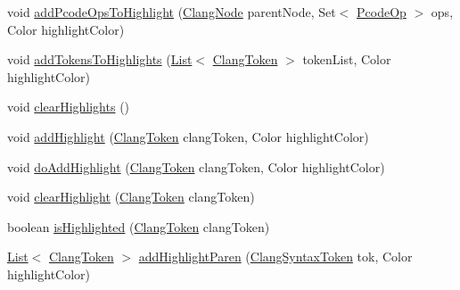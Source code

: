 \begin{DoxyCompactItemize}
\item 
void \mbox{\hyperlink{classghidra_1_1app_1_1decompiler_1_1component_1_1_clang_highlight_controller_a999122a27059713e3033e404e204e20f}{add\+Pcode\+Ops\+To\+Highlight}} (\mbox{\hyperlink{interfaceghidra_1_1app_1_1decompiler_1_1_clang_node}{Clang\+Node}} parent\+Node, Set$<$ \mbox{\hyperlink{class_pcode_op}{Pcode\+Op}} $>$ ops, Color highlight\+Color)
\item 
void \mbox{\hyperlink{classghidra_1_1app_1_1decompiler_1_1component_1_1_clang_highlight_controller_a918b0d193cddef3e884da17c1813bb46}{add\+Tokens\+To\+Highlights}} (\mbox{\hyperlink{xml_8hh_ab5ab62f46b3735557c125f91b40ac155}{List}}$<$ \mbox{\hyperlink{classghidra_1_1app_1_1decompiler_1_1_clang_token}{Clang\+Token}} $>$ token\+List, Color highlight\+Color)
\item 
void \mbox{\hyperlink{classghidra_1_1app_1_1decompiler_1_1component_1_1_clang_highlight_controller_a23d3b639418118f916813e02d99d8025}{clear\+Highlights}} ()
\item 
void \mbox{\hyperlink{classghidra_1_1app_1_1decompiler_1_1component_1_1_clang_highlight_controller_a8a3fd199e6bb9bf1533edbeedfadc614}{add\+Highlight}} (\mbox{\hyperlink{classghidra_1_1app_1_1decompiler_1_1_clang_token}{Clang\+Token}} clang\+Token, Color highlight\+Color)
\item 
void \mbox{\hyperlink{classghidra_1_1app_1_1decompiler_1_1component_1_1_clang_highlight_controller_adcaa163e6517db404fb5aee28b20b08d}{do\+Add\+Highlight}} (\mbox{\hyperlink{classghidra_1_1app_1_1decompiler_1_1_clang_token}{Clang\+Token}} clang\+Token, Color highlight\+Color)
\item 
void \mbox{\hyperlink{classghidra_1_1app_1_1decompiler_1_1component_1_1_clang_highlight_controller_a059003e77f6c6d6ecd7727c6840aefb8}{clear\+Highlight}} (\mbox{\hyperlink{classghidra_1_1app_1_1decompiler_1_1_clang_token}{Clang\+Token}} clang\+Token)
\item 
boolean \mbox{\hyperlink{classghidra_1_1app_1_1decompiler_1_1component_1_1_clang_highlight_controller_ae14a72d11ebc6ca440c68fe3ade4bb8d}{is\+Highlighted}} (\mbox{\hyperlink{classghidra_1_1app_1_1decompiler_1_1_clang_token}{Clang\+Token}} clang\+Token)
\item 
\mbox{\hyperlink{xml_8hh_ab5ab62f46b3735557c125f91b40ac155}{List}}$<$ \mbox{\hyperlink{classghidra_1_1app_1_1decompiler_1_1_clang_token}{Clang\+Token}} $>$ \mbox{\hyperlink{classghidra_1_1app_1_1decompiler_1_1component_1_1_clang_highlight_controller_a6a321654fc1984f10228d9fba4527da1}{add\+Highlight\+Paren}} (\mbox{\hyperlink{classghidra_1_1app_1_1decompiler_1_1_clang_syntax_token}{Clang\+Syntax\+Token}} tok, Color highlight\+Color)

\end{DoxyCompactItemize}
